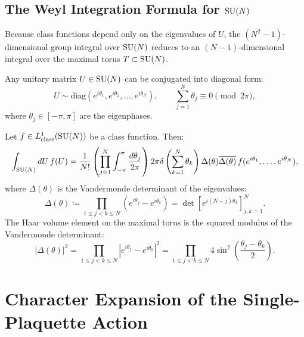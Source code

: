 \subsection{The Weyl Integration Formula for \texorpdfstring{$\mathrm{SU}(N)$}{SU(N)}}
\label{subsec:weyl_integration_formula}

Because class functions depend only on the eigenvalues of $U$, the $(N^2 - 1)$-dimensional group integral over $\mathrm{SU}(N)$ reduces to an $(N-1)$-dimensional integral over the maximal torus $T \subset \mathrm{SU}(N)$.

Any unitary matrix $U \in \mathrm{SU}(N)$ can be conjugated into diagonal form:
\begin{equation}
U \sim \mathrm{diag}\left( e^{i\theta_1}, e^{i\theta_2}, \dots, e^{i\theta_N} \right), \qquad \sum_{j=1}^N \theta_j \equiv 0 \pmod{2\pi},
\end{equation}
where $\theta_j \in [-\pi, \pi]$ are the eigenphases.

\begin{theorem}
\label{thm:weyl_integration}
Let $f \in L^1_{\mathrm{class}}(\mathrm{SU}(N))$ be a class function. Then:
\begin{equation}
\label{eq:weyl_integration_formula}
\int_{\mathrm{SU}(N)} dU \, f(U) = \frac{1}{N!} \left( \prod_{j=1}^N \int_{-\pi}^\pi \frac{d\theta_j}{2\pi} \right) 2\pi \delta\left( \sum_{k=1}^N \theta_k \right) \Delta(\theta) \overline{\Delta(\theta)} \, f(e^{i\theta_1}, \dots, e^{i\theta_N}),
\end{equation}
where $\Delta(\theta)$ is the Vandermonde determinant of the eigenvalues:
\begin{equation}
\label{eq:vandermonde_determinant}
\Delta(\theta) \coloneqq \prod_{1 \le j < k \le N} \left( e^{i\theta_j} - e^{i\theta_k} \right) = \det\left[ e^{i(N - j)\theta_k} \right]_{j, k = 1}^N.
\end{equation}
The Haar volume element on the maximal torus is the squared modulus of the Vandermonde determinant:
\begin{equation}
\label{eq:vandermonde_squared}
|\Delta(\theta)|^2 = \prod_{1 \le j < k \le N} \left| e^{i\theta_j} - e^{i\theta_k} \right|^2 = \prod_{1 \le j < k \le N} 4 \sin^2\left( \frac{\theta_j - \theta_k}{2} \right).
\end{equation}
\end{theorem}

\section{Character Expansion of the Single-Plaquette Action}
\label{sec:plaquette_character_expansion}

